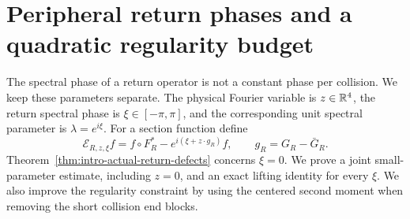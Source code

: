 \section{Peripheral return phases and a quadratic regularity budget}
\label{sec:peripheral-return-phases}
The spectral phase of a return operator is not a constant phase per
collision. We keep these parameters separate. The physical Fourier
variable is $z\in\mathbb R^4$, the return spectral phase is
$\xi\in[-\pi,\pi]$, and the corresponding unit spectral parameter is
$\lambda=e^{i\xi}$. For a section function define
\begin{equation}\label{eq:peripheral-return-defect}
 \mathcal E_{R,z,\xi}f
   =f\circ F_R^*-e^{i(\xi+z\cdot g_R)}f,
       \qquad g_R=G_R-\bar G_R.
\end{equation}
Theorem~\ref{thm:intro-actual-return-defects} concerns $\xi=0$.
We prove a joint small-parameter estimate, including $z=0$, and an
exact lifting identity for every $\xi$. We also improve the regularity
constraint by using the centered second moment when removing the
short collision end blocks.

